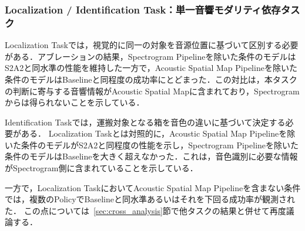 \documentclass{article}
\begin{document}
\subsubsection{Localization / Identification Task：単一音響モダリティ依存タスク}
	Localization Taskでは，視覚的に同一の対象を音源位置に基づいて区別する必要がある．アブレーションの結果，Spectrogram Pipelineを除いた条件のモデルはS2A2と同水準の性能を維持した一方で，Acoustic Spatial Map Pipelineを除いた条件のモデルはBaselineと同程度の成功率にとどまった．この対比は，本タスクの判断に寄与する音響情報がAcoustic Spatial Mapに含まれており，Spectrogramからは得られないことを示している．

	Identification Taskでは，運搬対象となる箱を音色の違いに基づいて決定する必要がある．
	Localization Taskとは対照的に，Acoustic Spatial Map Pipelineを除いた条件のモデルがS2A2と同程度の性能を示し，Spectrogram Pipelineを除いた条件のモデルはBaselineを大きく超えなかった．これは，音色識別に必要な情報がSpectrogram側に含まれていることを示している．


	一方で，Localization TaskにおいてAcoustic Spatial Map Pipelineを含まない条件では，複数のPolicyでBaselineと同水準あるいはそれを下回る成功率が観測された．
	この点については~\ref{sec:cross_analysis}節で他タスクの結果と併せて再度議論する．




\end{document}
